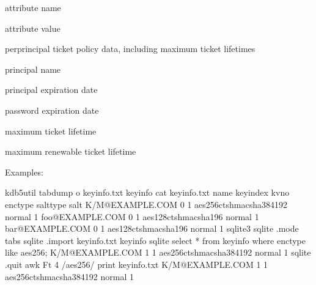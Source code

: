 \documentclass[letterpaper,10pt,english]{sphinxmanual}
\begin{document}
\begin{description}
\begin{description}
\sphinxAtStartPar
attribute name

\sphinxAtStartPar
attribute value

\end{description}

\sphinxAtStartPar
per\sphinxhyphen{}principal ticket policy data, including maximum ticket
lifetimes
\begin{description}
\sphinxAtStartPar
principal name

\sphinxAtStartPar
principal expiration date

\sphinxAtStartPar
password expiration date

\sphinxAtStartPar
maximum ticket lifetime

\sphinxAtStartPar
maximum renewable ticket lifetime

\end{description}

\end{description}

\sphinxAtStartPar
Examples:

\begin{sphinxVerbatim}[commandchars=\\\{\}]
\PYGZdl{} kdb5\PYGZus{}util tabdump \PYGZhy{}o keyinfo.txt keyinfo
\PYGZdl{} cat keyinfo.txt
name        keyindex        kvno    enctype salttype        salt
K/M@EXAMPLE.COM     0       1       aes256\PYGZhy{}cts\PYGZhy{}hmac\PYGZhy{}sha384\PYGZhy{}192      normal  \PYGZhy{}1
foo@EXAMPLE.COM     0       1       aes128\PYGZhy{}cts\PYGZhy{}hmac\PYGZhy{}sha1\PYGZhy{}96 normal  \PYGZhy{}1
bar@EXAMPLE.COM     0       1       aes128\PYGZhy{}cts\PYGZhy{}hmac\PYGZhy{}sha1\PYGZhy{}96 normal  \PYGZhy{}1
\PYGZdl{} sqlite3
sqlite\PYGZgt{} .mode tabs
sqlite\PYGZgt{} .import keyinfo.txt keyinfo
sqlite\PYGZgt{} select * from keyinfo where enctype like \PYGZsq{}aes256\PYGZhy{}\PYGZpc{}\PYGZsq{};
K/M@EXAMPLE.COM     1       1       aes256\PYGZhy{}cts\PYGZhy{}hmac\PYGZhy{}sha384\PYGZhy{}192      normal  \PYGZhy{}1
sqlite\PYGZgt{} .quit
\PYGZdl{} awk \PYGZhy{}F\PYGZsq{}\PYGZbs{}t\PYGZsq{} \PYGZsq{}\PYGZdl{}4 \PYGZti{} /aes256\PYGZhy{}/ \PYGZob{} print \PYGZcb{}\PYGZsq{} keyinfo.txt
K/M@EXAMPLE.COM     1       1       aes256\PYGZhy{}cts\PYGZhy{}hmac\PYGZhy{}sha384\PYGZhy{}192      normal  \PYGZhy{}1
\end{sphinxVerbatim}
\end{document}
